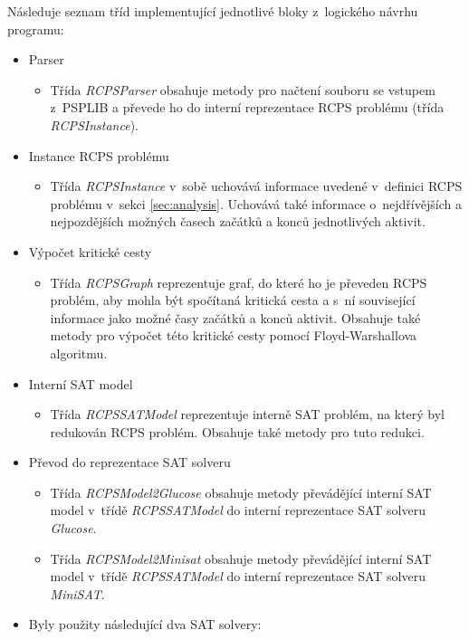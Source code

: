 \documentclass[a4paper, 12pt]{article}
\begin{document}
Následuje seznam tříd implementující jednotlivé bloky z~logického návrhu programu:
\begin{itemize}
 \item Parser
    \begin{itemize}
        \item Třída \emph{RCPSParser} obsahuje metody pro načtení souboru se vstupem z~PSPLIB a převede ho do interní
        reprezentace RCPS problému (třída \emph{RCPSInstance}).
    \end{itemize}
 \item Instance RCPS problému
    \begin{itemize}
        \item Třída \emph{RCPSInstance} v~sobě uchovává informace uvedené v~definici RCPS problému v~sekci \ref{sec:analysis}.
        Uchovává také informace o~nejdřívějších a nejpozdějších možných časech začátků a konců jednotlivých aktivit.
    \end{itemize}
 \item Výpočet kritické cesty
    \begin{itemize}
        \item Třída \emph{RCPSGraph} reprezentuje graf, do které ho je převeden RCPS problém, aby mohla být spočítaná kritická cesta a s~ní
        související informace jako možné časy začátků a konců aktivit.
        Obsahuje také metody pro výpočet této kritické cesty pomocí Floyd-Warshallova algoritmu.
    \end{itemize}
 \item Interní SAT model
    \begin{itemize}
        \item Třída \emph{RCPSSATModel} reprezentuje interně SAT problém, na který byl redukován RCPS problém.
        Obsahuje také metody pro tuto redukci.
    \end{itemize}
 \item Převod do reprezentace SAT solveru
    \begin{itemize}
        \item Třída \emph{RCPSModel2Glucose} obsahuje metody převádějící interní SAT model v~třídě \emph{RCPSSATModel}
        do interní reprezentace SAT solveru \emph{Glucose}.
        \item Třída \emph{RCPSModel2Minisat} obsahuje metody převádějící interní SAT model v~třídě \emph{RCPSSATModel}
        do interní reprezentace SAT solveru \emph{MiniSAT}.
    \end{itemize}
 \item Byly použity následující dva SAT solvery:

\end{itemize}
\end{document}

